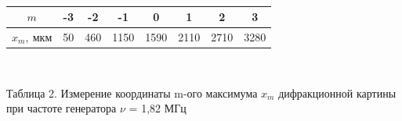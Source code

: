 \documentclass[a4paper,12pt]{article}
\begin{document}
\


\begin{center}
\begin{tabular}{|c|c|c|c|c|c|c|c|}
	\hline
	$m$ &-3&-2&-1&0&1&2&3\\
	\hline
	$x_m, \ \text{мкм}$ &50&460& 1150&1590&2110&2710&3280\\
	\hline
\end{tabular}

\


Таблица 2. Измерение координаты m-ого максимума $x_m$ дифракционной картины при частоте генератора $\nu$ = 1,82 МГц
\end{center}	

\newpage

\

\end{document}
